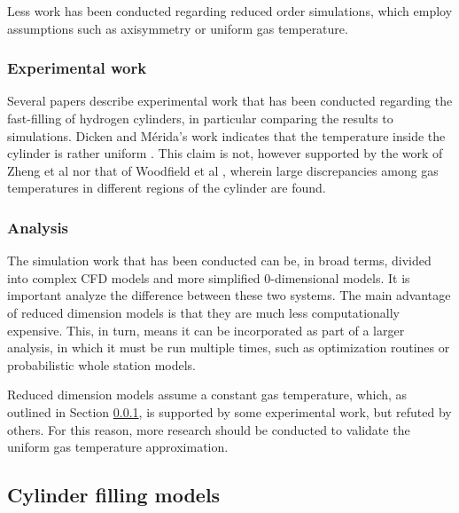Less work has been conducted regarding reduced order simulations, which employ assumptions such as axisymmetry or uniform gas temperature. 

\subsubsection{Experimental work}
\label{sec:experimental_work}
Several papers describe experimental work that has been conducted regarding the fast-filling of hydrogen cylinders, in particular comparing the results to simulations. Dicken and M\'erida's work indicates that the temperature inside the cylinder is rather uniform \cite{Dicken2007}. This claim is not, however supported by the work of Zheng et al  nor that of Woodfield et al \cite{Woodfield2008}, wherein large discrepancies among gas temperatures in different regions of the cylinder are found.

\subsubsection{Analysis}


The simulation work that has been conducted can be, in broad terms, divided into complex CFD models and more simplified 0-dimensional models. It is important analyze the difference between these two systems. The main advantage of reduced dimension models is that they are much less computationally expensive. This, in turn, means it can be incorporated as part of a larger analysis, in which it must be run multiple times, such as optimization routines or probabilistic whole station models.

Reduced dimension models assume a constant gas temperature, which, as outlined in Section \ref{sec:experimental_work}, is supported by some experimental work, but refuted by others. For this reason, more research should be conducted to validate the uniform gas temperature approximation.


\subsection{Cylinder filling models}

